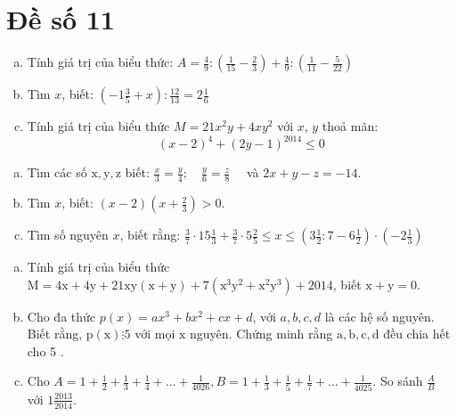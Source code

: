 \onehalfspacing
\section{Đề số 11}

\begin{bt} 
    \hfill
	\begin{enumerate}[a.]
		\item Tính giá trị của biểu thức: $A=\frac{4}{9}:\left(\frac{1}{15}-\frac{2}{3}\right)+\frac{4}{9}:\left(\frac{1}{11}-\frac{5}{22}\right)$
        \item Tìm $x$, biết: $\left(-1 \frac{3}{5}+x\right): \frac{12}{13}=2 \frac{1}{6}$
        \item Tính giá trị của biểu thức $M=21 x^2 y+4 x y^2$ với $x$, $y$ thoả mãn:
        $$
        (x-2)^4+(2 y-1)^{2014} \leq 0
        $$
	\end{enumerate}
	\loigiai{} 
\end{bt}

\begin{bt}
	\hfill
	\begin{enumerate}[a.]
		\item Tìm các số $\mathrm{x}, \mathrm{y}, \mathrm{z}$ biết: $\frac{x}{3}=\frac{y}{4} ; \quad \frac{y}{6}=\frac{z}{8} \quad$ và $2 x+y-z=-14$.
        \item Tìm $x$, biết: $(x-2)\left(x+\frac{2}{3}\right)>0$.
        \item Tìm số nguyên $x$, biết rằng: $\frac{3}{7} \cdot 15 \frac{1}{3}+\frac{3}{7} \cdot 5 \frac{2}{5} \leq x \leq\left(3 \frac{1}{2}: 7-6 \frac{1}{2}\right) \cdot\left(-2 \frac{1}{3}\right)$
	\end{enumerate}
	\loigiai{} 
\end{bt}

\begin{bt}
	\hfill
	\begin{enumerate}[a.]
		\item Tính giá trị của biểu thức $\mathrm{M}=4 \mathrm{x}+4 \mathrm{y}+21 \mathrm{xy}(\mathrm{x}+\mathrm{y})+7\left(\mathrm{x}^3 \mathrm{y}^2+\mathrm{x}^2 \mathrm{y}^3\right)+2014$, biết $\mathrm{x}+\mathrm{y}=0$.
        \item Cho đa thức $p(x)=a x^3+b x^2+c x+d$, với $a, b, c, d$ là các hệ số nguyên. Biết rằng, $\mathrm{p}(\mathrm{x}) \vdots 5$ với mọi $\mathrm{x}$ nguyên. Chứng minh rằng $\mathrm{a}, \mathrm{b}, \mathrm{c}, \mathrm{d}$ đều chia hết cho 5 .
        \item Cho $A=1+\frac{1}{2}+\frac{1}{3}+\frac{1}{4}+\ldots+\frac{1}{4026}, B=1+\frac{1}{3}+\frac{1}{5}+\frac{1}{7}+\ldots+\frac{1}{4025}$. So sánh $\frac{A}{B}$ với $1 \frac{2013}{2014}$.
	\end{enumerate}
	\loigiai{} 
\end{bt}

